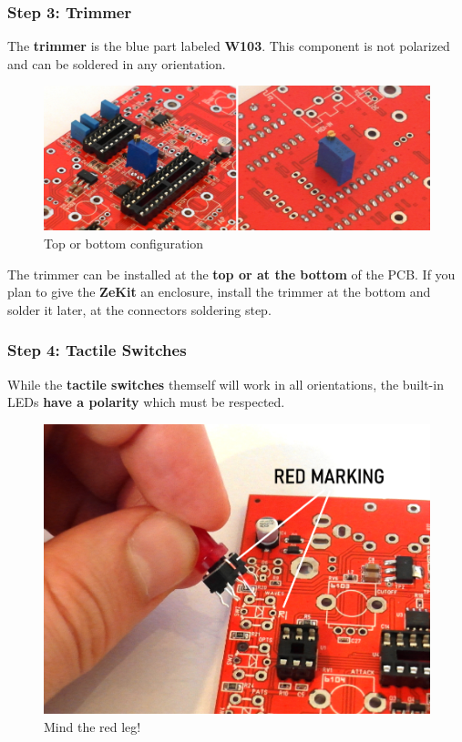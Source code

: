 \documentclass{scrartcl}
\begin{document}
\subsubsection{Step 3: Trimmer}

The \textbf{trimmer} is the blue part labeled \textbf{W103}. This component is not polarized and can be soldered in any orientation.

\begin{figure}[!ht]
    \begin{center}
        \includegraphics[scale=0.35]{assets/pcb-trimmer.jpg}
        \caption{Top or bottom configuration}
    \end{center}
\end{figure}

The trimmer can be installed at the \textbf{top or at the bottom} of the PCB. If you plan to give the \textbf{ZeKit} an enclosure, install the trimmer at the bottom and solder it later, at the connectors soldering step.

\subsubsection{Step 4: Tactile Switches}

While the \textbf{tactile switches} themself will work in all orientations, the built-in LEDs \textbf{have a polarity} which must be respected.

\begin{figure}[!ht]
    \begin{center}
        \includegraphics[scale=0.30]{assets/tact-marking.jpg}
        \caption{Mind the red leg!}
    \end{center}
\end{figure}
\end{document}
